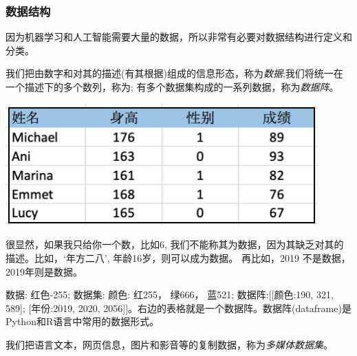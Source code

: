 \documentclass[12pt]{article}
\numberwithin{equation}{section}
\numberwithin{figure}{section}
\begin{document}
\subsubsection{数据结构}

因为机器学习和人工智能需要大量的数据，所以非常有必要对数据结构进行定义和分类。

\begin{definition}
	我们把由数字和对其的描述(有其根据)组成的信息形态，称为\textit{数据};我们将统一在一个描述下的多个数列，称为; 有多个数据集构成的一系列数据，称为\textit{数据阵}。
\end{definition}
\begin{marginfigure}
	\centering
	\includegraphics[width=0.9\textwidth]{fig/dataframeEx}
\end{marginfigure}
\begin{remark}
很显然，如果我只给你一个数，比如6, 我们不能称其为数据，因为其缺乏对其的描述。比如，`年方二八’, 年龄16岁，则可以成为数据。	再比如，2019 不是数据，2019年则是数据。
\end{remark}

\begin{example}
数据: 红色-255; 数据集: 颜色: 红255， 绿666， 蓝521; 数据阵:[[颜色:190, 321, 589]; [年份:2019, 2020, 2056]]。右边的表格就是一个数据阵。数据阵(dataframe)是Python和R语言中常用的数据形式。
\end{example}

\begin{definition}
	我们把语言文本，网页信息，图片和影音等的复制数据，称为\textit{多媒体数据集}。
\end{definition}
\end{document}
